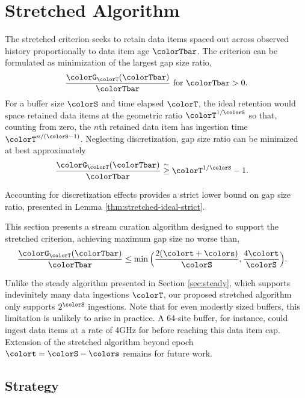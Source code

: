 \section{Stretched Algorithm} \label{sec:stretched}

The stretched criterion seeks to retain data items spaced out across observed history proportionally to data item age $\colorTbar$.
The criterion can be formulated as minimization of the largest gap size ratio,
\begin{align*}
\frac{\colorG_{\colorT}(\colorTbar)}{\colorTbar} \text{ for } \colorTbar > 0.
\end{align*}
For a buffer size $\colorS$ and time elapsed $\colorT$, the ideal retention would space retained data items at the geometric ratio $\colorT^{1/\colorS}$ so that, counting from zero, the $n$th retained data item has ingestion time $\colorT^{n/(\colorS - 1)}$.
Neglecting discretization, gap size ratio can be minimized at best approximately
\begin{align*}
\frac{\colorG_{\colorT}(\colorTbar)}{\colorTbar}
&\stackrel{\sim}{\geq}
\colorT^{1/\colorS} - 1.
\end{align*}

Accounting for discretization effects provides a strict lower bound on gap size ratio, presented in Lemma \ref{thm:stretched-ideal-strict}.



This section presents a stream curation algorithm designed to support the stretched criterion, achieving maximum gap size no worse than,
\begin{align*}
\frac{\colorG_{\colorT}(\colorTbar)}{\colorTbar}
&\leq
\min\Big(
  \frac{2(\colort + \colors)}{\colorS},
  \frac{4\colort}{\colorS}
\Big).
\end{align*}

Unlike the steady algorithm presented in Section \ref{sec:steady}, which supports indevinitely many data ingestions $\colorT$, our proposed stretched algorithm only supports $2^{\colorS}$ ingestions.
Note that for even modestly sized buffers, this limitation is unlikely to arise in practice.
A 64-site buffer, for instance, could ingest data items at a rate of 4GHz for before reaching this data item cap.
Extension of the stretched algorithm beyond epoch $\colort = \colorS - \colors$ remains for future work.

\subsection{Strategy}


